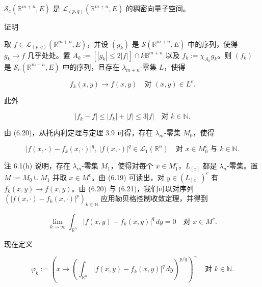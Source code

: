 \begin{lemma}

$ \mathcal{S}_{c}(\mathbb{R}^{m+n},E) $ 是 $ \mathcal{L}_{(p,q)}(\mathbb{R}^{m+n},E) $ 的稠密向量子空间。

证明

\begin{subitems}
\item

取 $ f \in \mathcal{L}_{(p,q)}(\mathbb{R}^{m+n},E) $，并设 $ (g_{k}) $ 是 $ \mathcal{S}(\mathbb{R}^{m+n},E) $ 中的序列，使得 $ g_{k} \to f $ 几乎处处。置 $ A_{k} := [|g_{k}| \le 2|f|] \cap k\mathbb{B}^{m+n} $ 以及 $ f_{k} := \chi_{A_{k}}g_{k} $。则 $ (f_{k}) $ 是 $ \mathcal{S}_{c}(\mathbb{R}^{m+n},E) $ 中的序列，且存在 $ \lambda_{m+n} $-零集 $ L $，使得

\begin{equation}
f_{k}(x,y) \to f(x,y) \quad \text{对 } (x,y) \in L^{c} .\tag{6.19}
\end{equation}

此外

\begin{equation}
|f_{k}-f| \le |f_{k}|+|f| \le 3|f| \quad \text{对 } k \in \mathbb{N} .\tag{6.20}
\end{equation}
\item

由 (6.20)，从托内利定理与定理 3.9 可得，存在 $ \lambda_{m} $-零集 $ M_{0} $，使得

\begin{equation}
|f(x,\cdot)-f_{k}(x,\cdot)|^{q},\ |f(x,\cdot)|^{q} \in \mathcal{L}_{1}(\mathbb{R}^{n}) \quad \text{对 } x \in M_{0}^{c} \text{ 与 } k \in \mathbb{N} .\tag{6.21}
\end{equation}

注 6.1(h) 说明，存在 $ \lambda_{m} $-零集 $ M_{1} $，使得对每个 $ x \in M_{1}^{c} $，$ L_{[x]} $ 都是 $ \lambda_{n} $-零集。置 $ M := M_{0} \cup M_{1} $ 并取 $ x \in M^{c} $。由 (6.19) 可读出，对 $ y \in (L_{[x]})^{c} $ 有 $ f_{k}(x,y) \to f(x,y) $。由 (6.20) 与 (6.21)，我们可以对序列 $ \left(|f(x,\cdot)-f_{k}(x,\cdot)|^{p}\right)_{k \in \mathbb{N}} $ 应用勒贝格控制收敛定理，并得到

\[
\lim_{k\to\infty}\int_{\mathbb{R}^{n}}|f(x,y)-f_{k}(x,y)|^{q}\,dy = 0 \quad \text{对 } x \in M^{c} .
\]

现在定义

\[
\varphi_{k} := \left(x \mapsto \left(\int_{\mathbb{R}^{n}}|f(x,y)-f_{k}(x,y)|^{q}\,dy\right)^{p/q}\right)^{\sim} \quad \text{对 } k \in \mathbb{N} .
\]


\end{subitems}
\end{lemma}
